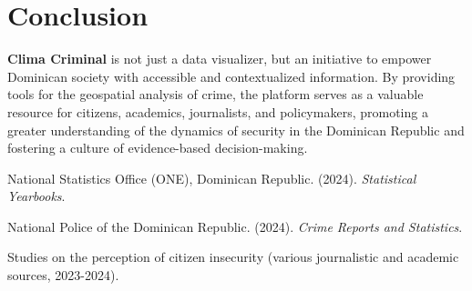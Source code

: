 \documentclass[12pt, a4paper]{article}
\begin{document}
\section{Conclusion}

\textbf{Clima Criminal} is not just a data visualizer, but an initiative to empower Dominican society with accessible and contextualized information. By providing tools for the geospatial analysis of crime, the platform serves as a valuable resource for citizens, academics, journalists, and policymakers, promoting a greater understanding of the dynamics of security in the Dominican Republic and fostering a culture of evidence-based decision-making.

\begin{thebibliography}{9}
    National Statistics Office (ONE), Dominican Republic. (2024). \textit{Statistical Yearbooks}.
    
    National Police of the Dominican Republic. (2024). \textit{Crime Reports and Statistics}.
    
    Studies on the perception of citizen insecurity (various journalistic and academic sources, 2023-2024).

\end{thebibliography}
\end{document}
